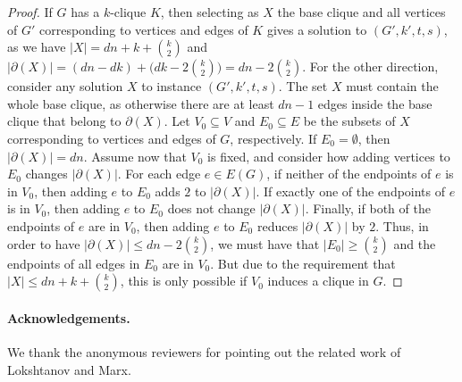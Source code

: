 \documentclass[a4paper,11pt]{article}
\theoremstyle{definition}
\theoremstyle{remark}
\newcommand{\card}[1]{\left\lvert {#1} \right\rvert}
\newcommand{\ebound}[1]{\card{\partial(#1)}}
\begin{document}
\begin{proof}
If $G$ has a $k$-clique $K$, then selecting as $X$ the base clique and all vertices of $G'$ corresponding to vertices and edges of $K$ gives a solution to $(G',k',t,s)$, as we have $\card{X} = dn + k + \binom{k}{2}$ and 
$\ebound{X} = (d n - d k) + \bigl(d k - 2 \binom{k}{2}\bigr) = d n - 2 \binom{k}{2}$. For the other direction, consider any solution $X$ to instance $(G',k',t,s)$. The set $X$ must contain the whole base clique, as otherwise there are at least $dn - 1$ edges inside the base clique that belong to $\partial(X)$. Let $V_0 \subseteq V$ and $E_0 \subseteq E$ be the subsets of $X$ corresponding to vertices and edges of $G$, respectively. If $E_0 = \emptyset$, then $\ebound{X} = d n$. Assume now that $V_0$ is fixed, and consider how adding vertices to $E_0$ changes  $\ebound{X}$. For each edge $e \in E(G)$, if neither of the endpoints of $e$ is in $V_0$, then adding $e$ to $E_0$ adds $2$ to $\ebound{X}$. If exactly one of the endpoints of $e$ is in $V_0$, then adding $e$ to $E_0$ does not change $\ebound{X}$. Finally, if both of the endpoints of $e$ are in $V_0$, then adding $e$ to $E_0$ reduces $\ebound{X}$ by $2$. Thus, in order to have $\ebound{X} \le d n  - 2 \binom{k}{2}$, we must have that $\card{E_0} \ge \binom{k}{2}$ and the endpoints of all edges in $E_0$ are in $V_0$. But due to the requirement that $\card{X} \le  dn + k + \binom{k}{2}$, this is only possible if $V_0$ induces a clique in $G$.
\end{proof}

\paragraph{Acknowledgements.} We thank the anonymous reviewers for pointing out the related work of Lokshtanov and Marx.



\end{document}
